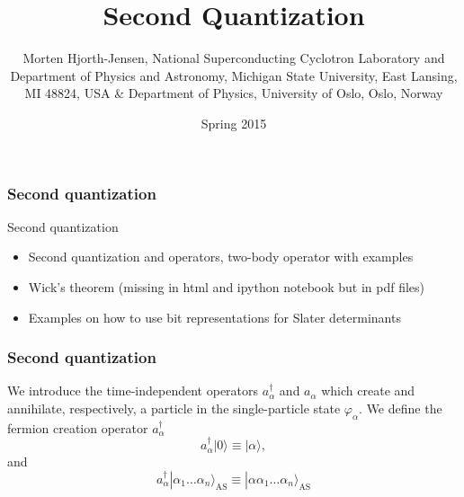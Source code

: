 \documentclass{beamer}
\begin{document}




\title{Second Quantization}


\author{Morten Hjorth-Jensen, National Superconducting Cyclotron Laboratory and Department of Physics and Astronomy, Michigan State University, East Lansing, MI 48824, USA {\&} Department of Physics, University of Oslo, Oslo, Norway\inst{}}
\institute{}

\date{Spring 2015
}

\begin{frame}
\titlepage
\end{frame}

\begin{frame}
\frametitle{Second quantization}

\begin{block}{Second quantization }
\begin{itemize}
\item Second quantization and operators, two-body operator with examples 

\item Wick's theorem (missing in html and ipython notebook but in pdf files)

\item Examples on how to use bit representations for Slater determinants
\end{itemize}

\noindent
\end{block}
\end{frame}

\begin{frame}
\frametitle{Second quantization}

\begin{block}{}
We introduce the time-independent  operators
$a_\alpha^{\dagger}$ and $a_\alpha$   which create and annihilate, respectively, a particle 
in the single-particle state 
$\varphi_\alpha$. 
We define the fermion creation operator
$a_\alpha^{\dagger}$ 
\begin{equation}
	a_\alpha^{\dagger}|0\rangle \equiv  |\alpha\rangle  \label{eq:2-1a},
\end{equation}
and
\begin{equation}
	a_\alpha^{\dagger}|\alpha_1\dots \alpha_n\rangle_{\mathrm{AS}} \equiv  |\alpha\alpha_1\dots \alpha_n\rangle_{\mathrm{AS}} \label{eq:2-1b}
\end{equation}
\end{block}
\end{frame}
\end{document}
